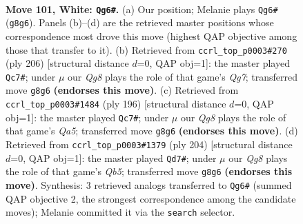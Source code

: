 \documentclass[11pt]{article}
\begin{document}
\clearpage

\begin{figure}[p]\centering
\begin{subfigure}{0.46\textwidth}\centering
\resizebox{\linewidth}{!}{%
\newchessgame
\chessboard[
  setfen={6Q1/8/7k/5K2/8/8/8/8 w - - 13 101},
  showmover=false,
  pgfstyle=straightmove, color=movearrow, markmove={g8-g6}
]}
\caption{}
\end{subfigure}\hfill
\begin{subfigure}{0.46\textwidth}\centering
\resizebox{\linewidth}{!}{%
\newchessgame
\chessboard[
  setfen={2k5/6Q1/3K4/8/8/8/8/8 w - - 9 104},
  showmover=false,
  pgfstyle=straightmove, color=movearrow, markmove={g7-c7}
]}
\caption{}
\end{subfigure}
\\[4pt]
\begin{subfigure}{0.46\textwidth}\centering
\resizebox{\linewidth}{!}{%
\newchessgame
\chessboard[
  setfen={2k5/8/2K5/Q7/8/8/8/8 w - - 11 99},
  showmover=false,
  pgfstyle=straightmove, color=movearrow, markmove={a5-c7}
]}
\caption{}
\end{subfigure}\hfill
\begin{subfigure}{0.46\textwidth}\centering
\resizebox{\linewidth}{!}{%
\newchessgame
\chessboard[
  setfen={3k4/8/3K4/1Q6/8/8/8/8 w - - 13 103},
  showmover=false,
  pgfstyle=straightmove, color=movearrow, markmove={b5-d7}
]}
\caption{}
\end{subfigure}
\caption{\textbf{Move 101, White: \texttt{Qg6\#}.} (a) Our position; Melanie plays \texttt{Qg6\#} (\texttt{g8g6}). Panels (b)--(d) are the retrieved master positions whose correspondence most drove this move (highest QAP objective among those that transfer to it). (b) Retrieved from \texttt{ccrl\_top\_p0003\#270} (ply 206) [structural distance $d$=0, QAP obj=1]: the master played \texttt{Qc7\#}; under $\mu$ our \emph{Qg8} plays the role of that game's \emph{Qg7}; transferred move \texttt{g8g6} \textbf{(endorses this move)}. (c) Retrieved from \texttt{ccrl\_top\_p0003\#1484} (ply 196) [structural distance $d$=0, QAP obj=1]: the master played \texttt{Qc7\#}; under $\mu$ our \emph{Qg8} plays the role of that game's \emph{Qa5}; transferred move \texttt{g8g6} \textbf{(endorses this move)}. (d) Retrieved from \texttt{ccrl\_top\_p0003\#1379} (ply 204) [structural distance $d$=0, QAP obj=1]: the master played \texttt{Qd7\#}; under $\mu$ our \emph{Qg8} plays the role of that game's \emph{Qb5}; transferred move \texttt{g8g6} \textbf{(endorses this move)}. Synthesis: 3 retrieved analogs transferred to \texttt{Qg6\#} (summed QAP objective 2, the strongest correspondence among the candidate moves); Melanie committed it via the \texttt{search} selector.}
\label{fig:thought-m200}
\end{figure}
\end{document}

